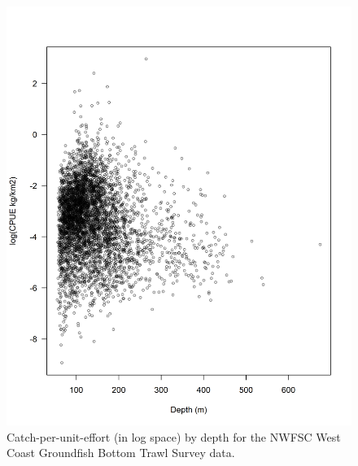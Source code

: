 \documentclass[12pt,]{article}
\begin{document}
\begin{figure}
\centering
\includegraphics{Figures/NWFSC_CPUE_Depth.png}
\caption{Catch-per-unit-effort (in log space) by depth for the NWFSC
West Coast Groundfish Bottom Trawl Survey data.
\label{fig:nw_cpue_depth}}
\end{figure}

\FloatBarrier
\end{document}

